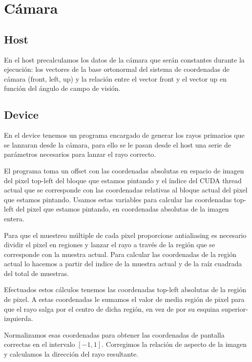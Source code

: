 \section{Cámara}

\subsection{Host}

En el host precalculamos los datos de la cámara que serán constantes durante la ejecución: los vectores de la base ortonormal del sistema de coordenadas de cámara (front, left, up) y la relación entre el vector front y el vector up en función del ángulo de campo de visión.

\subsection{Device}

En el device tenemos un programa encargado de generar los rayos primarios que se lanzaran desde la cámara, para ello se le pasan desde el host una serie de parámetros necesarios para lanzar el rayo correcto.

El programa toma un offset con las coordenadas absolutas en espacio de imagen del pixel top-left del bloque que estamos pintando y el índice del CUDA thread actual que se corresponde con las coordenadas relativas al bloque actual del pixel que estamos pintando. Usamos estas variables para calcular las coordenadas top-left del pixel que estamos pintando, en coordenadas absolutas de la imagen entera.

\medskip

Para que el muestreo múltiple de cada pixel proporcione antialiasing es necesario dividir el pixel en regiones y lanzar el rayo a través de la región que se corresponde con la muestra actual. Para calcular las coordenadas de la región actual lo hacemos a partir del indice de la muestra actual y de la raíz cuadrada del total de muestras.

\medskip

Efectuados estos cálculos tenemos las coordenadas top-left absolutas de la región de pixel. A estas coordenadas le sumamos el valor de media región de pixel para que el rayo salga por el centro de dicha región, en vez de por su esquina superior-izquierda.

\medskip

Normalizamos esas coordenadas para obtener las coordenadas de pantalla correctas en el intervalo $[-1, 1]$. Corregimos la relación de aspecto de la imagen y calculamos la dirección del rayo resultante.

